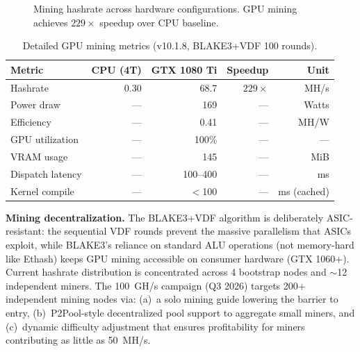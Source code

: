 \documentclass[11pt,a4paper]{article}
\begin{document}
\begin{figure}[H]
\centering
{}
\caption{Mining hashrate across hardware configurations. GPU mining achieves $229\times$ speedup over CPU baseline.}
\end{figure}

\begin{table}[H]
\centering
\begin{tabular}{l r r r r}
\toprule
\textbf{Metric} & \textbf{CPU (4T)} & \textbf{GTX 1080 Ti} & \textbf{Speedup} & \textbf{Unit} \\
\midrule
Hashrate & 0.30 & 68.7 & $229\times$ & MH/s \\
Power draw & --- & 169 & --- & Watts \\
Efficiency & --- & 0.41 & --- & MH/W \\
GPU utilization & --- & 100\% & --- & --- \\
VRAM usage & --- & 145 & --- & MiB \\
Dispatch latency & --- & 100--400 & --- & ms \\
Kernel compile & --- & $<$100 & --- & ms (cached) \\
\bottomrule
\end{tabular}
\caption{Detailed GPU mining metrics (v10.1.8, BLAKE3+VDF 100 rounds).}
\end{table}

\noindent\textbf{Mining decentralization.} The BLAKE3+VDF algorithm is deliberately ASIC-resistant: the sequential VDF rounds prevent the massive parallelism that ASICs exploit, while BLAKE3's reliance on standard ALU operations (not memory-hard like Ethash) keeps GPU mining accessible on consumer hardware (GTX 1060+). Current hashrate distribution is concentrated across 4 bootstrap nodes and $\sim$12 independent miners. The 100~GH/s campaign (Q3 2026) targets 200+ independent mining nodes via: (a)~a solo mining guide lowering the barrier to entry, (b)~P2Pool-style decentralized pool support to aggregate small miners, and (c)~dynamic difficulty adjustment that ensures profitability for miners contributing as little as 50~MH/s.
\end{document}
